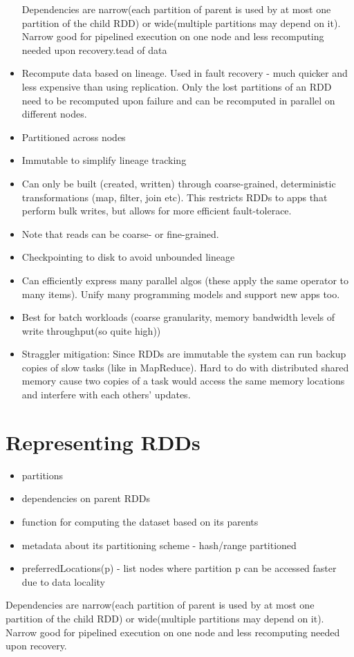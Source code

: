 \begin{itemize}
\begin{itemize}
    \end{itemize}
    Dependencies are narrow(each partition of parent is used by at most one partition of the child RDD) or wide(multiple partitions may depend on it).
    Narrow good for pipelined execution on one node and less recomputing needed upon recovery.tead of data
    \item Recompute data based on lineage. Used in fault recovery - much quicker and less expensive than using replication. Only the lost partitions of an RDD need to be recomputed upon failure and can be recomputed in parallel on different nodes.
    \item Partitioned across nodes
    \item Immutable to simplify lineage tracking
    \item Can only be built (created, written) through coarse-grained, deterministic transformations (map, filter, join etc). This restricts RDDs to apps that perform bulk writes, but allows for more efficient fault-tolerace.
    \item Note that reads can be coarse- or fine-grained.
    \item Checkpointing to disk to avoid unbounded lineage
    \item Can efficiently express many parallel algos (these apply the same operator to many items). Unify many programming models and support new apps too.
    \item Best for batch workloads (coarse granularity, memory bandwidth levels of write throughput(so quite high))
    \item Straggler mitigation: Since RDDs are immutable the system can run backup copies of slow tasks (like in MapReduce). Hard to do with distributed shared memory cause two copies of a task would access the same memory locations and interfere with each others' updates.
\end{itemize}

\section{Representing RDDs}
\begin{itemize}
    \item partitions
    \item dependencies on parent RDDs
    \item function for computing the dataset based on its parents
    \item metadata about its partitioning scheme - hash/range partitioned
    \item preferredLocations(p) - list nodes where partition p can be accessed faster due to data locality
    
\end{itemize}
Dependencies are narrow(each partition of parent is used by at most one partition of the child RDD) or wide(multiple partitions may depend on it).
Narrow good for pipelined execution on one node and less recomputing needed upon recovery.

